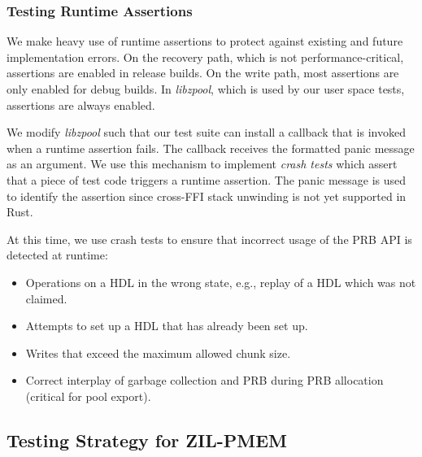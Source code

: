 \documentclass[12pt,a4paper,twoside]{book}
\begin{document}
\subsubsection{Testing Runtime Assertions}
We make heavy use of runtime assertions to protect against existing and future implementation errors.
On the recovery path, which is not performance-critical, assertions are enabled in release builds.
On the write path, most assertions are only enabled for debug builds.
In \textit{libzpool}, which is used by our user space tests, assertions are always enabled.

We modify \textit{libzpool} such that our test suite can install a callback that is invoked when a runtime assertion fails.
The callback receives the formatted panic message as an argument.
We use this mechanism to implement \textit{crash tests} which assert that a piece of test code triggers a runtime assertion.
The panic message is used to identify the assertion since cross-FFI stack unwinding is not yet supported in Rust.

At this time, we use crash tests to ensure that incorrect usage of the PRB API is detected at runtime:
\begin{itemize}[noitemsep]
    \item Operations on a HDL in the wrong state, e.g., replay of a HDL which was not claimed.
    \item Attempts to set up a HDL that has already been set up.
    \item Writes that exceed the maximum allowed chunk size.
    \item Correct interplay of garbage collection and PRB during PRB allocation (critical for pool export).
\end{itemize}

\subsection{Testing Strategy for ZIL-PMEM}\label{sec:eval:correctness:zilpmem}
\end{document}
